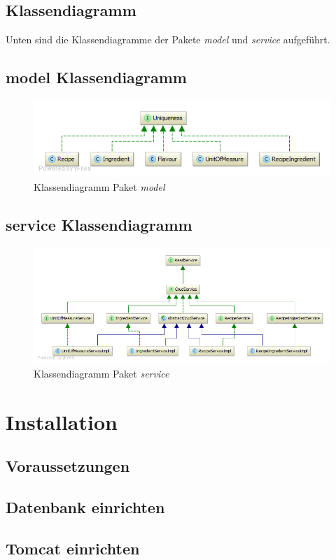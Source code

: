 \subsection{Klassendiagramm}
Unten sind die Klassendiagramme der Pakete \emph{model} und \emph{service} aufgeführt.

\subsection{model Klassendiagramm}

\begin{figure}[h]
\centering
\includegraphics[width=0.6\columnwidth]{graphics/model_Klassendiagramm.png}%
	\caption{Klassendiagramm Paket \emph{model}}
	\label{fig:model_Klassendiagramm}
\end{figure}

\subsection{service Klassendiagramm}
\begin{figure}[h]
\centering
\includegraphics[width=0.6\columnwidth]{graphics/service_Klassendiagramm.png}%
	\caption{Klassendiagramm Paket \emph{service}}
	\label{fig:service_Klassendiagramm}
\end{figure}

\section{Installation}

\subsection{Voraussetzungen}


\subsection{Datenbank einrichten}



\subsection{Tomcat einrichten}



